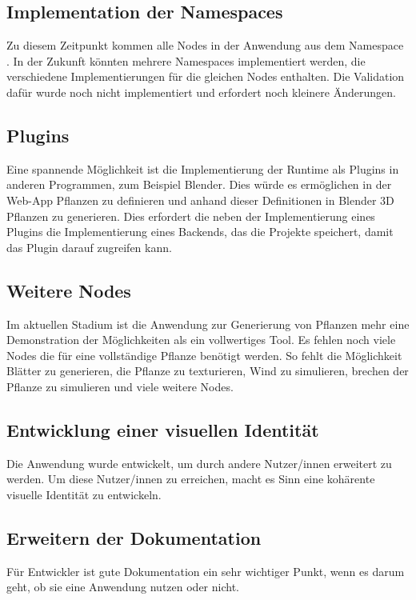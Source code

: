 \documentclass[ngerman]{article}
\begin{document}
\subsection*{Implementation der Namespaces}
Zu diesem Zeitpunkt kommen alle Nodes in der Anwendung aus dem Namespace . In der Zukunft könnten mehrere Namespaces implementiert werden, die verschiedene Implementierungen für die gleichen Nodes enthalten. Die Validation dafür wurde noch nicht implementiert und erfordert noch kleinere Änderungen.

\subsection*{Plugins}
Eine spannende Möglichkeit ist die Implementierung der Runtime als Plugins in anderen Programmen, zum Beispiel Blender. Dies würde es ermöglichen in der Web-App Pflanzen zu definieren und anhand dieser Definitionen in Blender 3D Pflanzen zu generieren. Dies erfordert die neben der Implementierung eines Plugins die Implementierung eines Backends, das die Projekte speichert, damit das Plugin darauf zugreifen kann.

\subsection*{Weitere Nodes}
Im aktuellen Stadium ist die Anwendung zur Generierung von Pflanzen mehr eine Demonstration der Möglichkeiten als ein vollwertiges Tool. Es fehlen noch viele Nodes die für eine vollständige Pflanze benötigt werden. So fehlt die Möglichkeit Blätter zu generieren, die Pflanze zu texturieren, Wind zu simulieren, brechen der Pflanze zu simulieren und viele weitere Nodes.

\subsection*{Entwicklung einer visuellen Identität}
Die Anwendung wurde entwickelt, um durch andere Nutzer/innen erweitert zu werden. 
Um diese Nutzer/innen zu erreichen, macht es Sinn eine kohärente visuelle Identität zu entwickeln.

\subsection*{Erweitern der Dokumentation}
Für Entwickler ist gute Dokumentation ein sehr wichtiger Punkt, wenn es darum geht, ob sie eine Anwendung nutzen oder nicht. 
\end{document}
